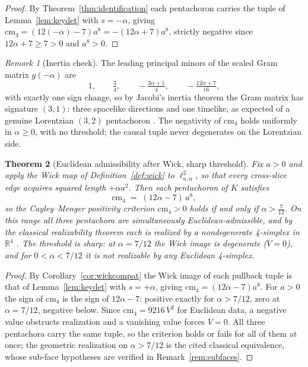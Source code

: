 \documentclass[11pt]{article}
\newtheorem{theorem}{Theorem}[section]
\theoremstyle{definition}
\theoremstyle{remark}
\newtheorem{remark}[theorem]{Remark}
\newcommand{\cm}{\mathrm{cm}_{4}}
\newcommand{\R}{\mathbb{R}}
\newcommand{\Kmin}{K}
\newcommand{\ltwo}{\ell^{2}_{a,\alpha}}
\begin{document}
\begin{proof}
By Theorem~\ref{thm:identification} each pentachoron carries the tuple of Lemma~\ref{lem:keydet} with $s=-\alpha$, giving $\cm=(12(-\alpha)-7)a^{8}=-(12\alpha+7)a^{8}$, strictly negative since $12\alpha+7\ge 7>0$ and $a^{8}>0$.
\end{proof}

\begin{remark}[Inertia check]
\label{rem:inertia}
The leading principal minors of the scaled Gram matrix $g(-\alpha)$ are
\[
1,\qquad \tfrac34,\qquad -\tfrac{3\alpha+1}{4},\qquad -\tfrac{12\alpha+7}{16},
\]
with exactly one sign change, so by Jacobi's inertia theorem the Gram matrix has signature $(3,1)$: three spacelike directions and one timelike, as expected of a genuine Lorentzian $(3,2)$ pentachoron \cite{AJL,SorkinAngles}. The negativity of $\cm$ holds uniformly in $\alpha\ge 0$, with no threshold; the causal tuple never degenerates on the Lorentzian side.
\end{remark}

\begin{theorem}[Euclidean admissibility after Wick, sharp threshold]
\label{thm:wick}
Fix $a>0$ and apply the Wick map of Definition~\ref{def:wick} to $\ltwo$, so that every cross-slice edge acquires squared length $+\alpha a^{2}$. Then each pentachoron of $\Kmin$ satisfies
\[
\cm \;=\; (12\alpha-7)\,a^{8},
\]
so the Cayley--Menger positivity criterion $\cm>0$ holds if and only if $\alpha>\tfrac{7}{12}$. On this range all three pentachora are simultaneously Euclidean-admissible, and by the classical realizability theorem each is realized by a nondegenerate 4-simplex in $\R^{4}$ \cite{Menger,Blumenthal,Berger}. The threshold is sharp: at $\alpha=7/12$ the Wick image is degenerate ($V=0$), and for $0<\alpha<7/12$ it is not realizable by any Euclidean 4-simplex.
\end{theorem}

\begin{proof}
By Corollary~\ref{cor:wickcompat} the Wick image of each pullback tuple is that of Lemma~\ref{lem:keydet} with $s=+\alpha$, giving $\cm=(12\alpha-7)a^{8}$. For $a>0$ the sign of $\cm$ is the sign of $12\alpha-7$: positive exactly for $\alpha>7/12$, zero at $\alpha=7/12$, negative below. Since $\cm=9216\,V^{2}$ for Euclidean data, a negative value obstructs realization and a vanishing value forces $V=0$. All three pentachora carry the same tuple, so the criterion holds or fails for all of them at once; the geometric realization on $\alpha>7/12$ is the cited classical equivalence, whose sub-face hypotheses are verified in Remark~\ref{rem:subfaces}.
\end{proof}
\end{document}

